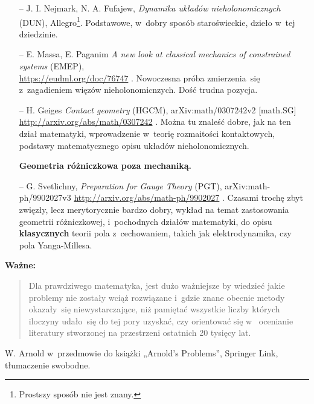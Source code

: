 \documentclass[a4paper,11pt]{article}
\begin{document}
\begin{itemize}
\item[--] J. I. Nejmark, N. A. Fufajew, \emph{Dynamika układów
    nieholonomicznych} (DUN), Allegro\footnote{Prostszy sposób nie
    jest znany.}. Podstawowe, w~dobry sposób staroświeckie, dzieło
  w~tej dziedzinie.

\item[--] E. Massa, E. Paganim \emph{A new look at classical mechanics
    of constrained systems} (EMEP), \\
  \url{https://eudml.org/doc/76747} . Nowoczesna próba zmierzenia~się
  z~zagadieniem więzów nieholonomicnzych. Dość trudna pozycja.

\item[--] H. Geiges \emph{Contact geometry} (HGCM),
  arXiv:math/0307242v2 [math.SG]
  \url{http://arxiv.org/abs/math/0307242} . Można tu znaleść dobre,
  jak na ten dział matematyki, wprowadzenie w~teorię rozmaitości
  kontaktowych, podstawy matematycznego opisu układów
  nieholonomicznych.


\item[] \textbf{Geometria różniczkowa poza mechaniką.}

\item[--] G. Svetlichny, \emph{Preparation for Gauge Theory} (PGT),
  arXiv:math-ph/9902027v3 \url{http://arxiv.org/abs/math-ph/9902027} .
  Czasami trochę zbyt zwięzły, lecz merytorycznie bardzo dobry, wykład
  na temat zastosowania geometrii różniczkowej, i~pochodnych działów
  matematyki, do opisu \textbf{klasycznych} teorii pola z~cechowaniem,
  takich jak elektrodynamika, czy pola Yanga-Millesa.

\end{itemize}





\textbf{Ważne:}

\begin{quote}
  Dla prawdziwego matematyka, jest dużo ważniejsze by wiedzieć jakie
  problemy nie zostały wciąż rozwiązane i~gdzie znane obecnie metody
  okazały~się niewystarczające, niż pamiętać wszystkie liczby których
  iloczyny udało~się do tej pory uzyskać, czy orientować się w~
  ocenianie literatury stworzonej na przestrzeni ostatnich 20 tysięcy
  lat.
\end{quote}

W. Arnold w~przedmowie do książki „Arnold's Problems”, Springer Link, tłumaczenie swobodne. \\
\end{document}

